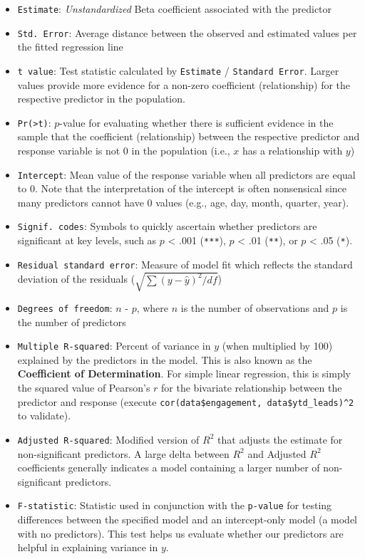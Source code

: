 \documentclass[
]{book}
\providecommand{\tightlist}{%
  \setlength{\itemsep}{0pt}\setlength{\parskip}{0pt}}
\begin{document}
\begin{itemize}
\tightlist
\item
  \texttt{Estimate}: \emph{Unstandardized} Beta coefficient associated with the predictor
\item
  \texttt{Std.\ Error}: Average distance between the observed and estimated values per the fitted regression line
\item
  \texttt{t\ value}: Test statistic calculated by \texttt{Estimate} / \texttt{Standard\ Error}. Larger values provide more evidence for a non-zero coefficient (relationship) for the respective predictor in the population.
\item
  \texttt{Pr(\textgreater{}\textbar{}t\textbar{})}: \(p\)-value for evaluating whether there is sufficient evidence in the sample that the coefficient (relationship) between the respective predictor and response variable is not 0 in the population (i.e., \(x\) has a relationship with \(y\))
\item
  \texttt{Intercept}: Mean value of the response variable when all predictors are equal to 0. Note that the interpretation of the intercept is often nonsensical since many predictors cannot have 0 values (e.g., age, day, month, quarter, year).
\item
  \texttt{Signif.\ codes}: Symbols to quickly ascertain whether predictors are significant at key levels, such as \(p\) \textless{} .001 (\texttt{***}), \(p\) \textless{} .01 (\texttt{**}), or \(p\) \textless{} .05 (\texttt{*}).
\item
  \texttt{Residual\ standard\ error}: Measure of model fit which reflects the standard deviation of the residuals (\(\sqrt {\sum(y-\hat{y})^2 / df}\))
\item
  \texttt{Degrees\ of\ freedom}: \(n\) - \(p\), where \(n\) is the number of observations and \(p\) is the number of predictors
\item
  \texttt{Multiple\ R-squared}: Percent of variance in \(y\) (when multiplied by 100) explained by the predictors in the model. This is also known as the \textbf{Coefficient of Determination}. For simple linear regression, this is simply the squared value of Pearson's \(r\) for the bivariate relationship between the predictor and response (execute \texttt{cor(data\$engagement,\ data\$ytd\_leads)\^{}2} to validate).
\item
  \texttt{Adjusted\ R-squared}: Modified version of \(R^2\) that adjusts the estimate for non-significant predictors. A large delta between \(R^2\) and Adjusted \(R^2\) coefficients generally indicates a model containing a larger number of non-significant predictors.
\item
  \texttt{F-statistic}: Statistic used in conjunction with the \texttt{p-value} for testing differences between the specified model and an intercept-only model (a model with no predictors). This test helps us evaluate whether our predictors are helpful in explaining variance in \(y\).
\end{itemize}
\end{document}
